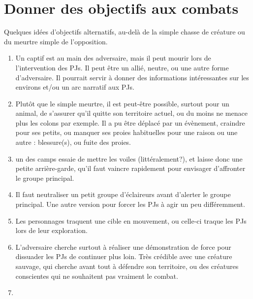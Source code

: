 \documentclass[10pt,a4paper]{book}
\begin{document}
\section{Donner des objectifs aux combats}
Quelques idées d'objectifs alternatifs, au-delà de la simple chasse de créature ou du meurtre simple de l'opposition.
\begin{enumerate}
\item Un captif est au main des adversaire, mais il peut mourir lors de l'intervention des PJs. Il peut être un allié, neutre, ou une autre forme d'adversaire. Il pourrait servir à donner des informations intéressantes sur les environs et/ou un arc narratif aux PJs.
\item Plutôt que le simple meurtre, il est peut-être possible, surtout pour un animal, de s'assurer qu'il quitte son territoire actuel, ou du moins ne menace plus les colons par exemple. Il a pu être déplacé par un évènement, craindre pour ses petits, ou manquer ses proies habituelles pour une raison ou une autre : blessure(s), ou fuite des proies.
\item un des camps essaie de mettre les voiles (littéralement?), et laisse donc une petite arrière-garde, qu'il faut vaincre rapidement pour envisager d'affronter le groupe principal.
\item Il faut neutraliser un petit groupe d'éclaireurs avant d'alerter le groupe principal. Une autre version pour forcer les PJs à agir un peu différemment.
\item Les personnages traquent une cible en mouvement, ou celle-ci traque les PJs lors de leur exploration.
\item L'adversaire cherche surtout à réaliser une démonstration de force pour dissuader les PJs de continuer plus loin. Très crédible avec une créature sauvage, qui cherche avant tout à défendre son territoire, ou des créatures conscientes qui ne souhaitent pas vraiment le combat.
\item 
\end{enumerate}
\end{document}
